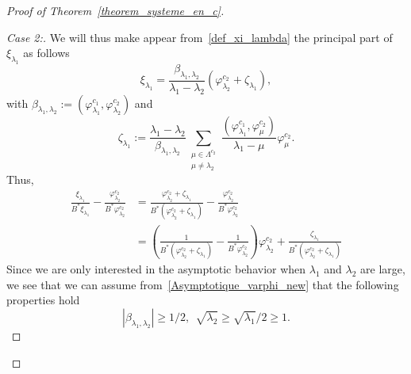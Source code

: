 \documentclass[10pt]{amsart}
\theoremstyle{definition}\newtheorem{defi}[theo]{Definition}\newtheorem{rema}[theo]{Remark}\newtheorem{exam}[theo]{Example}\newtheorem{exem}[theo]{Example}\newtheorem{nota}[theo]{Notation}
\newenvironment{step}[1]{\begin{proof}[#1]}{\let\qed\relax\end{proof}}
\newcommand{\fprop}[2]{\varphi^{#1}_{#2}}
\begin{document}
\begin{proof}[Proof of Theorem~\ref{theorem_systeme_en_c}]
\begin{step}{Case 2:}
We will thus make appear from~\eqref{def_xi_lambda} the principal part of $\xi_{\lambda_1}$ as follows
\[
\xi_{\lambda_1} = \frac{\beta_{\lambda_1,\lambda_2}}{\lambda_1-\lambda_2} \left(\fprop{c_2}{\lambda_2} + \zeta_{\lambda_1}\right),
\]
with $\beta_{\lambda_1,\lambda_2} := (\fprop{c_1}{\lambda_1},\fprop{c_2}{\lambda_2})$ and
\[
\zeta_{\lambda_1} := \frac{\lambda_1-\lambda_2}{\beta_{\lambda_1,\lambda_2}} \sum_{\substack{\mu\in \Lambda^{c_2}\\ \mu\neq\lambda_2}} \frac{\left(\fprop{c_1}{\lambda_1},\fprop{c_2}{\mu}\right)}{\lambda_1-\mu} \fprop{c_2}{\mu}.
\]
Thus,
\begin{equation}\label{MiseEnValeurCompensation}
\begin{aligned}
\frac{\xi_{\lambda_1}}{B^* \xi_{\lambda_1}} - \frac{\fprop{c_2}{\lambda_2}}{B^* \fprop{c_2}{\lambda_2}} &=
\frac{\fprop{c_2}{\lambda_2}+\zeta_{\lambda_1}}{B^*(\fprop{c_2}{\lambda_2}+\zeta_{\lambda_1}) } - \frac{\fprop{c_2}{\lambda_2}}{B^* \fprop{c_2}{\lambda_2}}
\\
&= \left(\frac{1}{B^* (\fprop{c_2}{\lambda_2}+\zeta_{\lambda_1})} - \frac{1}{B^* \fprop{c_2}{\lambda_2}} \right) \fprop{c_2}{\lambda_2} + \frac{\zeta_{\lambda_1}}{B^* \left(\fprop{c_2}{\lambda_2}+\zeta_{\lambda_1}\right)}
\end{aligned}
\end{equation}
Since we are only interested in the asymptotic behavior when $\lambda_1$ and $\lambda_2$ are large, we see that we can assume from~\eqref{Asymptotique_varphi_new} that the following properties hold
\begin{equation}\label{lambda_est_grand}
|\beta_{\lambda_1,\lambda_2}| \geq 1/2, \ \ \sqrt{\lambda_2}\geq \sqrt{\lambda_1}/2\geq 1.
\end{equation}


\end{step}
\end{proof}
\end{document}
